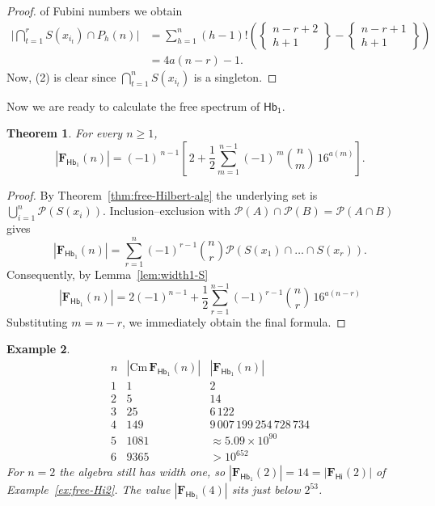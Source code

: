 \documentclass{amsart}
\newcommand{\new}[1]{{\color{blue} #1}}
\newtheorem{theorem}{Theorem}[section]
\newtheorem{example}[theorem]{Example}
\newcommand{\alg}[1]{\mathbf{#1}}
\newcommand{\var}[1]{\mathsf{#1}}
\newcommand{\cm}[1]{\mathrm{Cm}\, #1}
\def\pw{\mathscr{P}}
\begin{document}
\begin{proof}
of Fubini numbers we obtain
\begin{align*}
\bigl|\bigcap_{t=1}^{r}S(x_{i_t})\cap P_h(n)\bigr|
 &=
\sum_{h=1}^n(h-1)!\left(\begin{Bmatrix}n-r+2\\ h+1\end{Bmatrix} -
   \begin{Bmatrix}n-r+1\\ h+1\end{Bmatrix}\right)\\
 &= 4 a(n-r) - 1.
\end{align*}
Now, (2) is clear since $\bigcap_{t=1}^{n}S(x_{i_t})$ is a singleton. 
\end{proof}

Now we are ready to calculate the free spectrum of $\var{Hb_1}$. 

\begin{theorem}\label{thm:width1-spectrum}
For every $n\geq1$,
\[
  |\alg{F}_{\var{Hb}_1}(n)|
  = (-1)^{\,n-1}\left[\,2
    + \frac12\sum_{m=1}^{n-1}(-1)^{\,m}\binom{n}{m}\,16^{a(m)}\right].
\]
\end{theorem}

\begin{proof}
By Theorem~\ref{thm:free-Hilbert-alg} the underlying set is
$\bigcup_{i=1}^{n}\pw(S(x_i))$. Inclusion--exclusion with
$\pw(A)\cap\pw(B)=\pw(A\cap B)$ gives
\[
  |\alg{F}_{\var{Hb}_1}(n)|
  =\sum_{r=1}^{n}(-1)^{r-1}\binom{n}{r}
\pw(S(x_1)\cap\dots\cap S(x_r)).
\]
Consequently, by Lemma~\ref{lem:width1-S}
$$
|\alg{F}_{\var{Hb}_1}(n)| = 
2(-1)^{n-1}+ \frac{1}{2}\sum_{r=1}^{n-1}(-1)^{r-1}\binom{n}{r}\,16^{a(n-r)}
$$
Substituting $m=n-r$, we immediately obtain
the final formula.
\end{proof}

\begin{example}\label{ex:width1-values}
\[
\renewcommand{\arraystretch}{1.2}
\begin{array}{c|c|l}
 n & |\cm{\alg{F}_{\var{Hb}_1}(n)}| & |\alg{F}_{\var{Hb}_1}(n)| \\\hline
 1 & 1    & 2 \\
 2 & 5    & 14 \\
 3 & 25   & 6\,122 \\
 4 & 149  & 9\,007\,199\,254\,728\,734 \\
 5 & 1081 & \approx 5.09\times10^{90} \\
 6 & 9365 & > 10^{652}
\end{array}
\]
For $n=2$ the algebra still has width one, so
$|\alg{F}_{\var{Hb}_1}(2)|=14=|\alg{F}_{\var{Hi}}(2)|$ of
Example~\ref{ex:free-Hi2}. The value $|\alg{F}_{\var{Hb}_1}(4)|$ sits just below
$2^{53}$.
\end{example}
\end{document}
